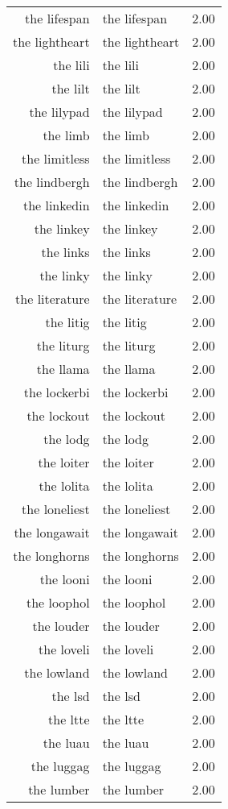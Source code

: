\begin{table}[ht]
\begin{tabular}{rlr}
  the lifespan & the lifespan & 2.00 \\ 
  the lightheart & the lightheart & 2.00 \\ 
  the lili & the lili & 2.00 \\ 
  the lilt & the lilt & 2.00 \\ 
  the lilypad & the lilypad & 2.00 \\ 
  the limb & the limb & 2.00 \\ 
  the limitless & the limitless & 2.00 \\ 
  the lindbergh & the lindbergh & 2.00 \\ 
  the linkedin & the linkedin & 2.00 \\ 
  the linkey & the linkey & 2.00 \\ 
  the links & the links & 2.00 \\ 
  the linky & the linky & 2.00 \\ 
  the literature & the literature & 2.00 \\ 
  the litig & the litig & 2.00 \\ 
  the liturg & the liturg & 2.00 \\ 
  the llama & the llama & 2.00 \\ 
  the lockerbi & the lockerbi & 2.00 \\ 
  the lockout & the lockout & 2.00 \\ 
  the lodg & the lodg & 2.00 \\ 
  the loiter & the loiter & 2.00 \\ 
  the lolita & the lolita & 2.00 \\ 
  the loneliest & the loneliest & 2.00 \\ 
  the longawait & the longawait & 2.00 \\ 
  the longhorns & the longhorns & 2.00 \\ 
  the looni & the looni & 2.00 \\ 
  the loophol & the loophol & 2.00 \\ 
  the louder & the louder & 2.00 \\ 
  the loveli & the loveli & 2.00 \\ 
  the lowland & the lowland & 2.00 \\ 
  the lsd & the lsd & 2.00 \\ 
  the ltte & the ltte & 2.00 \\ 
  the luau & the luau & 2.00 \\ 
  the luggag & the luggag & 2.00 \\ 
  the lumber & the lumber & 2.00 \\ 

\end{tabular}
\end{table}
